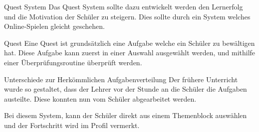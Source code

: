 Quest System
Das Quest System sollte dazu entwickelt werden den Lernerfolg und die Motivation der Schüler zu steigern. Dies sollte durch ein System welches Online-Spielen gleicht geschehen.

Quest
Eine Quest ist grundsätzlich eine Aufgabe welche ein Schüler zu bewältigen hat. Diese Aufgabe kann zuerst in einer Auswahl ausgewählt werden, und mithilfe einer Überprüfungsroutine überprüft werden.

Unterschiede zur Herkömmlichen Aufgabenverteilung
Der frühere Unterricht wurde so gestaltet, dass der Lehrer vor der Stunde an die Schüler die Aufgaben austeilte. Diese konnten nun vom Schüler abgearbeitet werden.

Bei diesem System, kann der Schüler direkt aus einem Themenblock auswählen und der Fortschritt wird im Profil vermerkt.